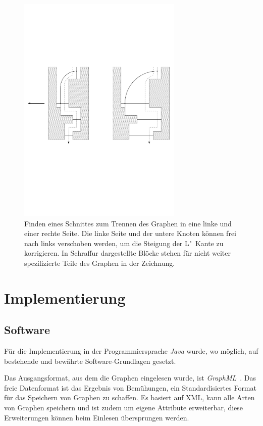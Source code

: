 \documentclass[a4paper]{scrreprt}
\theoremstyle{definition}
\begin{document}
\begin{figure}[h]
  \centering
  \includegraphics[width=0.7\textwidth]{cut_L_slope_correction}
  \caption{Finden eines Schnittes zum Trennen des Graphen in eine linke und einer rechte Seite. Die linke Seite und der untere Knoten können frei nach links verschoben werden, um die Steigung der L"~Kante zu korrigieren. In Schraffur dargestellte Blöcke stehen für nicht weiter spezifizierte Teile des Graphen in der Zeichnung.}
  \label{fig:cutLslopecorrection}
\end{figure}






\chapter{Implementierung}

\section{Software}

Für die Implementierung in der Programmiersprache \emph{Java} wurde, wo möglich, auf bestehende und bewährte Software-Grundlagen gesetzt.

Das Ausgangsformat, aus dem die Graphen eingelesen wurde, ist \emph{GraphML}~\cite{brandes+al-14}. Das freie Datenformat ist das Ergebnis von Bemühungen, ein Standardisiertes Format für das Speichern von Graphen zu schaffen. Es basiert auf XML, kann alle Arten von Graphen speichern und ist zudem um eigene Attribute erweiterbar, diese Erweiterungen können beim Einlesen übersprungen werden.
\end{document}
